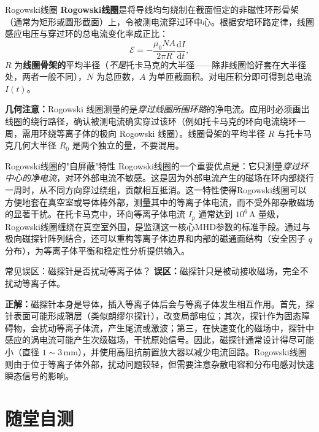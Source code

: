 \documentclass[12pt,a4paper,openany,oneside]{book}
\newcommand{\diff}{\mathrm{d}}
\begin{document}
\begin{definition}{Rogowski线圈}{}{}
\textbf{Rogowski线圈}是将导线均匀绕制在截面恒定的非磁性环形骨架（通常为矩形或圆形截面）上，令被测电流穿过环中心。根据安培环路定律，线圈感应电压与穿过环的总电流变化率成正比：
\begin{equation}
\mathcal{E} = -\frac{\mu_0 N A}{2\pi R}\frac{\diff I}{\diff t},
\label{eq:rogowski}
\end{equation}
$R$ 为\textbf{线圈骨架的}平均半径（\emph{不是}托卡马克的大半径——除非线圈恰好套在大半径处，两者一般不同），$N$ 为总匝数，$A$ 为单匝截面积。对电压积分即可得到总电流 $I(t)$。

\textbf{几何注意：}Rogowski 线圈测量的是\emph{穿过线圈所围环路}的净电流。应用时必须画出线圈的绕行路径，确认被测电流确实穿过该环（例如托卡马克的环向电流绕环一周，需用环绕等离子体的极向 Rogowski 线圈）。线圈骨架的平均半径 $R$ 与托卡马克几何大半径 $R_0$ 是两个独立的量，不要混用。
\end{definition}

\begin{insight}{Rogowski线圈的"自屏蔽"特性}{}
Rogowski线圈的一个重要优点是：它只测量\emph{穿过环中心的净电流}，对环外部电流不敏感。这是因为外部电流产生的磁场在环内部绕行一周时，从不同方向穿过绕组，贡献相互抵消。这一特性使得Rogowski线圈可以方便地套在真空室或导体棒外部，测量其中的等离子体电流，而不受外部杂散磁场的显著干扰。在托卡马克中，环向等离子体电流 $I_p$ 通常达到 $10^6\,\mathrm{A}$ 量级，Rogowski线圈缠绕在真空室外围，是监测这一核心MHD参数的标准手段。通过与极向磁探针阵列结合，还可以重构等离子体边界和内部的磁通面结构（安全因子 $q$ 分布），为等离子体平衡和稳定性分析提供输入。
\end{insight}

\begin{warning}{常见误区：磁探针是否扰动等离子体？}{}
\textbf{误区：}磁探针只是被动接收磁场，完全不扰动等离子体。

\textbf{正解：}磁探针本身是导体，插入等离子体后会与等离子体发生相互作用。首先，探针表面可能形成鞘层（类似朗缪尔探针），改变局部电位；其次，探针作为固态障碍物，会扰动等离子体流，产生尾流或激波；第三，在快速变化的磁场中，探针中感应的涡电流可能产生次级磁场，干扰原始信号。因此，磁探针通常设计得尽可能小（直径 $1\sim 3\,\mathrm{mm}$），并使用高阻抗前置放大器以减少电流回路。Rogowski线圈则由于位于等离子体外部，扰动问题较轻，但需要注意杂散电容和分布电感对快速瞬态信号的影响。
\end{warning}


\section*{随堂自测}
\end{document}
